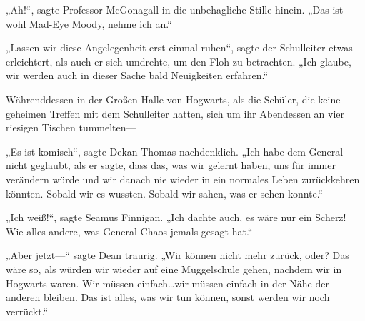 „Ah!“, sagte Professor McGonagall in die unbehagliche Stille hinein. „Das ist wohl Mad-Eye Moody, nehme ich an.“

„Lassen wir diese Angelegenheit erst einmal ruhen“, sagte der Schulleiter etwas erleichtert, als auch er sich umdrehte, um den Floh zu betrachten. „Ich glaube, wir werden auch in dieser Sache bald Neuigkeiten erfahren.“


Währenddessen in der Großen Halle von Hogwarts, als die Schüler, die keine geheimen Treffen mit dem Schulleiter hatten, sich um ihr Abendessen an vier riesigen Tischen tummelten—

„Es ist komisch“, sagte Dekan Thomas nachdenklich. „Ich habe dem General nicht geglaubt, als er sagte, dass das, was wir gelernt haben, uns für immer verändern würde und wir danach nie wieder in ein normales Leben zurückkehren könnten. Sobald wir es wussten. Sobald wir sahen, was er sehen konnte.“

„Ich weiß!“, sagte Seamus Finnigan. „Ich dachte auch, es wäre nur ein Scherz! Wie alles andere, was General Chaos jemals gesagt hat.“

„Aber jetzt—“ sagte Dean traurig. „Wir können nicht mehr zurück, oder? Das wäre so, als würden wir wieder auf eine Muggelschule gehen, nachdem wir in Hogwarts waren. Wir müssen einfach…wir müssen einfach in der Nähe der anderen bleiben. Das ist alles, was wir tun können, sonst werden wir noch verrückt.“

